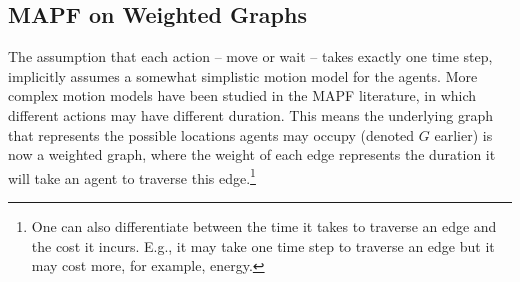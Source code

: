 \documentclass[letterpaper]{article} %
\begin{document}
\subsection{MAPF on Weighted Graphs}
The assumption that each action -- move or wait -- takes exactly one time step, implicitly assumes a somewhat simplistic motion model for the agents. 
More complex motion models have been studied in the MAPF literature, in which different actions may have different duration. %
This means the underlying graph that represents the possible locations agents may occupy (denoted $G$ earlier) is now a weighted graph, where the weight of each edge represents the duration it will take an agent to traverse this edge.\footnote{One can also differentiate between the time it takes to traverse an edge and the cost it incurs. E.g., it may take one time step to traverse an edge but it may cost more, for example, energy.}
\end{document}
